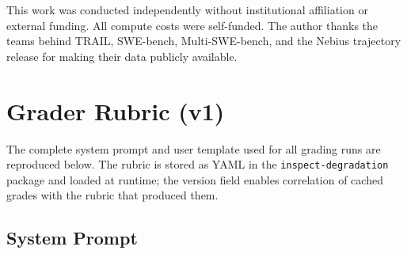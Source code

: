 \documentclass[11pt]{article}
\begin{document}
\begin{ack}
This work was conducted independently without institutional affiliation or external funding. All compute costs were self-funded. The author thanks the teams behind TRAIL, SWE-bench, Multi-SWE-bench, and the Nebius trajectory release for making their data publicly available.
\end{ack}

\appendix

\section{Grader Rubric (v1)}
\label{app:rubric}

The complete system prompt and user template used for all grading runs are reproduced below.
The rubric is stored as YAML in the \texttt{inspect-degradation} package and loaded at runtime; the version field enables correlation of cached grades with the rubric that produced them.

\subsection*{System Prompt}
\end{document}
